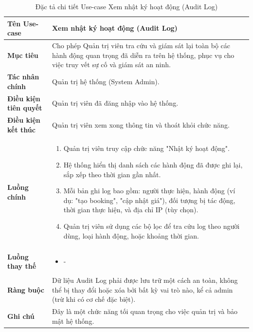 \begin{table}[H]
\centering
\renewcommand{\arraystretch}{1.3}
\begin{tabular}{|p{4cm}|p{10cm}|}
\hline
\textbf{Tên Use-case} 
& Xem nhật ký hoạt động (Audit Log) \\ 
\hline

\textbf{Mục tiêu} 
& Cho phép Quản trị viên tra cứu và giám sát lại toàn bộ các hành động quan trọng đã diễn ra trên hệ thống, phục vụ cho việc truy vết sự cố và giám sát an ninh. \\ 
\hline

\textbf{Tác nhân chính} 
& Quản trị hệ thống (System Admin). \\ 
\hline

\textbf{Điều kiện tiên quyết} 
& Quản trị viên đã đăng nhập vào hệ thống. \\ 
\hline

\textbf{Điều kiện kết thúc} 
& Quản trị viên xem xong thông tin và thoát khỏi chức năng. \\ 
\hline

\textbf{Luồng chính} 
& 
\begin{enumerate}
    \item Quản trị viên truy cập chức năng "Nhật ký hoạt động".
    \item Hệ thống hiển thị danh sách các hành động đã được ghi lại, sắp xếp theo thời gian gần nhất.
    \item Mỗi bản ghi log bao gồm: người thực hiện, hành động (ví dụ: "tạo booking", "cập nhật giá"), đối tượng bị tác động, thời gian thực hiện, và địa chỉ IP (tùy chọn).
    \item Quản trị viên sử dụng các bộ lọc để tra cứu log theo người dùng, loại hành động, hoặc khoảng thời gian.
\end{enumerate} \\ 
\hline

\textbf{Luồng thay thế} 
& 
\begin{itemize}
    \item -
\end{itemize} \\ 
\hline

\textbf{Ràng buộc} 
& Dữ liệu Audit Log phải được lưu trữ một cách an toàn, không thể bị thay đổi hoặc xóa bởi bất kỳ vai trò nào, kể cả admin (trừ khi có cơ chế đặc biệt). \\ 
\hline

\textbf{Ghi chú} 
& Đây là một chức năng tối quan trọng cho việc quản trị và bảo mật hệ thống. \\ 
\hline
\end{tabular}
\caption{Đặc tả chi tiết Use-case Xem nhật ký hoạt động (Audit Log)}
\label{tab:audit-log-spec}
\end{table}


